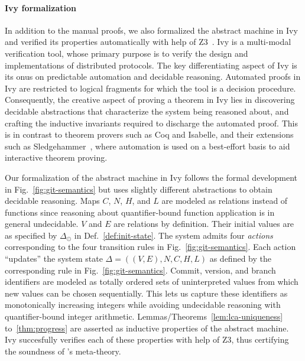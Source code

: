\noindent\paragraph{Ivy formalization}  In addition to the manual
proofs, we also formalized the \quark abstract machine in
Ivy~\cite{ivy} and verified its properties automatically with help of
Z3~\cite{z3}. Ivy is a multi-modal verification tool, whose primary
purpose is to verify the design and implementations of distributed
protocols. The key differentiating aspect of Ivy is its onus on
predictable automation and decidable reasoning.  Automated proofs in
Ivy are restricted to logical fragments for which the tool is a
decision procedure. %
Consequently, the creative aspect of proving a theorem in Ivy lies in
discovering decidable abstractions that characterize the system being
reasoned about, and crafting the inductive invariants required to
discharge the automated proof. This is in contrast to theorem provers
such as Coq and Isabelle, and their extensions such as
Sledgehammer~\cite{sledge}, where automation is used on a best-effort
basis to aid interactive theorem proving.

Our formalization of the \quark abstract machine in Ivy follows the
formal development in Fig.~\ref{fig:git-semantics} but uses slightly
different abstractions to obtain decidable reasoning. Maps $C$, $N$,
$H$, and $L$ are modeled as relations instead of functions since
reasoning about quantifier-bound function application is in general
undecidable. $V$ and $E$ are relations by definition. Their initial
values are as specified by $\Delta_{\odot}$ in
Def.~\ref{def:init-state}. The system admits four \emph{actions}
corresponding to the four transition rules in
Fig.~\ref{fig:git-semantics}. Each action ``updates'' the system state
$\Delta = ((V,E),N,C,H,L)$ as defined by the corresponding rule in
Fig.~\ref{fig:git-semantics}.
Commit, version, and branch identifiers are modeled as totally ordered
sets of uninterpreted values from which new values can be chosen
sequentially. This lets us capture these identifiers as monotonically
increasing integers while avoiding undecidable reasoning with
quantifier-bound integer arithmetic.
Lemmas/Theorems~\ref{lem:lca-uniqueness} to~\ref{thm:progress} are
asserted as inductive properties of the \quark abstract machine. Ivy
succesfully verifies each of these properties with help of Z3, thus
certifying the soundness of \quark's meta-theory.
